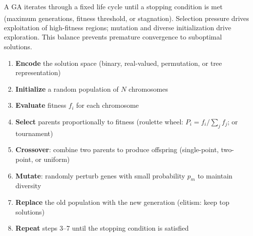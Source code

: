 \begin{tcbitemize}[ skin=sectionraster ]
    \tcbitem[title={The GA Life Cycle}, raster multicolumn=3]
    A GA iterates through a fixed life cycle until a stopping condition is met (maximum generations, fitness threshold, or stagnation)\textsuperscript{\cite[][pp.~95--110]{hurbansGrokkingArtificialIntelligence2020}}. Selection pressure drives exploitation of high-fitness regions; mutation and diverse initialization drive exploration. This balance prevents premature convergence to suboptimal solutions.
    \tcblower
    \begin{enumerate}
        \item \textbf{Encode} the solution space (binary, real-valued, permutation, or tree representation)
        \item \textbf{Initialize} a random population of $N$ chromosomes
        \item \textbf{Evaluate} fitness $f_i$ for each chromosome
        \item \textbf{Select} parents proportionally to fitness (roulette wheel: $P_i = f_i / \sum_j f_j$; or tournament)
        \item \textbf{Crossover}: combine two parents to produce offspring (single-point, two-point, or uniform)
        \item \textbf{Mutate}: randomly perturb genes with small probability $p_m$ to maintain diversity
        \item \textbf{Replace} the old population with the new generation (elitism: keep top solutions)
        \item \textbf{Repeat} steps 3--7 until the stopping condition is satisfied
    \end{enumerate}


\end{tcbitemize}
